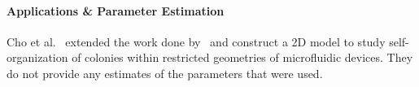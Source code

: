 \documentclass{article}
\begin{document}
\paragraph{Applications \& Parameter Estimation}

Cho et al.~\cite{Cho2007} extended the work done by~\cite{Jnsson2005} and construct a 2D model to
study self-organization of colonies within restricted geometries of microfluidic devices.
They do not provide any estimates of the parameters that were used.
\end{document}
